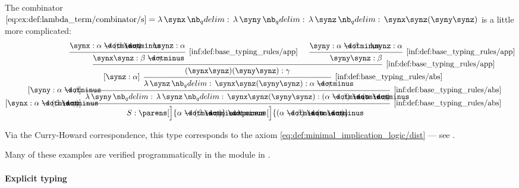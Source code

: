 \begin{example}
\begin{thmenum}
     The combinator \( \ref{eq:ex:def:lambda_term/combinator/s} = \qabs \synx \qabs \syny \qabs \synz \synx \synz (\syny \synz) \) is a little more complicated:
    \begin{equation*}
      \begin{prooftree}
        \hypo{ \synx: \alpha \synimplies (\beta \synimplies \gamma) }
        \hypo{ \synz: \alpha }
        \infer2[\ref{inf:def:base_typing_rules/app}]{ \synx \synz: \beta \synimplies \gamma }

        \hypo{ \syny: \alpha \synimplies \beta }
        \hypo{ \synz: \alpha }
        \infer2[\ref{inf:def:base_typing_rules/app}]{ \syny \synz: \beta }

        \infer2[\ref{inf:def:base_typing_rules/app}]{ (\synx \synz) (\syny \synz): \gamma }
        \infer[left label=\( [\synz: \alpha] \)]1[\ref{inf:def:base_typing_rules/abs}]{ \qabs \synz \synx \synz (\syny \synz): \alpha \synimplies \gamma }
        \infer[left label=\( [\syny: \alpha \synimplies \beta] \)]1[\ref{inf:def:base_typing_rules/abs}]{ \qabs \syny \qabs \synz \synx \synz (\syny \synz): (\alpha \synimplies \beta) \synimplies (\alpha \synimplies \gamma) }
        \infer[left label=\( [\synx: \alpha \synimplies (\beta \synimplies \gamma)] \)]1[\ref{inf:def:base_typing_rules/abs}]{ S: \parens[\Big]{ \alpha \synimplies (\beta \synimplies \gamma) } \synimplies \parens[\Big]{ (\alpha \synimplies \beta) \synimplies (\alpha \synimplies \gamma) } }
      \end{prooftree}
    \end{equation*}

    Via the Curry-Howard correspondence, this type corresponds to the axiom \eqref{eq:def:minimal_implication_logic/dist} --- see .
  \end{thmenum}
\end{example}
\begin{comments}
  \item Many of these examples are verified programmatically in the module  in \cite{notebook:code}.
\end{comments}

\paragraph{Explicit typing}


